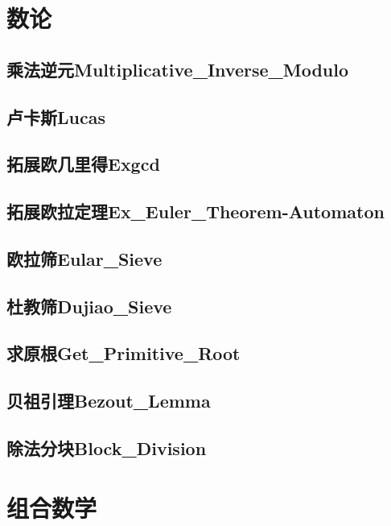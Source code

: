 \documentclass[10pt,a4paper]{article}
\begin{document}
\section{数论}
\subsection{乘法逆元Multiplicative\_Inverse\_Modulo}

\subsection{卢卡斯Lucas}

\subsection{拓展欧几里得Exgcd}

\subsection{拓展欧拉定理Ex\_Euler\_Theorem-Automaton}

\subsection{欧拉筛Eular\_Sieve}

\subsection{杜教筛Dujiao\_Sieve}

\subsection{求原根Get\_Primitive\_Root}

\subsection{贝祖引理Bezout\_Lemma}

\subsection{除法分块Block\_Division}


\newpage
\section{组合数学}
\end{document}
